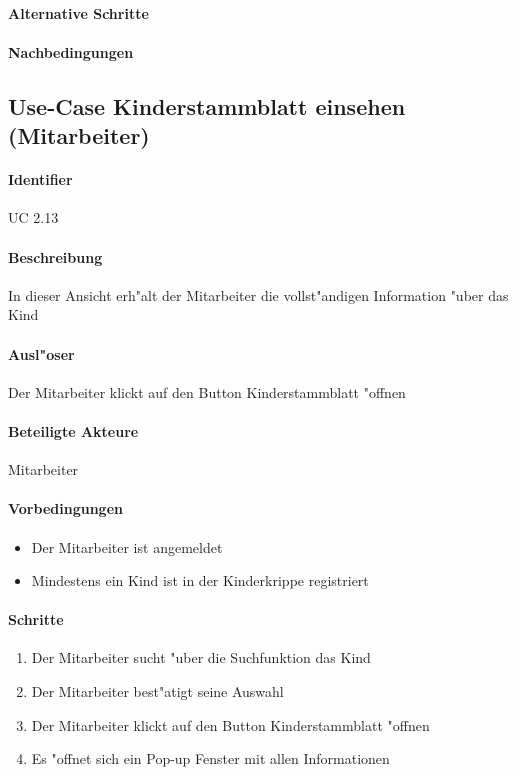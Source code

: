 	\paragraph{Alternative Schritte}
	\paragraph{Nachbedingungen}
	  
    
  
  
  \newpage
 \subsection{Use-Case Kinderstammblatt einsehen (Mitarbeiter)}
  \paragraph{Identifier}
  UC 2.13
  \paragraph{Beschreibung}
  In dieser Ansicht erh"alt der Mitarbeiter die vollst"andigen Information "uber das Kind
  \paragraph{Ausl"oser}
  Der Mitarbeiter klickt auf den Button \dq Kinderstammblatt "offnen\dq
  \paragraph{Beteiligte Akteure}   \leavevmode \newline
    Mitarbeiter
  \paragraph{Vorbedingungen}
  \begin{itemize}
   \item Der Mitarbeiter ist angemeldet
   \item Mindestens ein Kind ist in der Kinderkrippe registriert
  \end{itemize}

  \paragraph{Schritte}
  \begin{enumerate}
   \item Der Mitarbeiter sucht "uber die Suchfunktion das Kind
   \item Der Mitarbeiter best"atigt seine Auswahl
   \item Der Mitarbeiter klickt auf den Button \dq Kinderstammblatt "offnen\dq
   \item Es "offnet sich ein Pop-up Fenster mit allen Informationen
  \end{enumerate}
  
